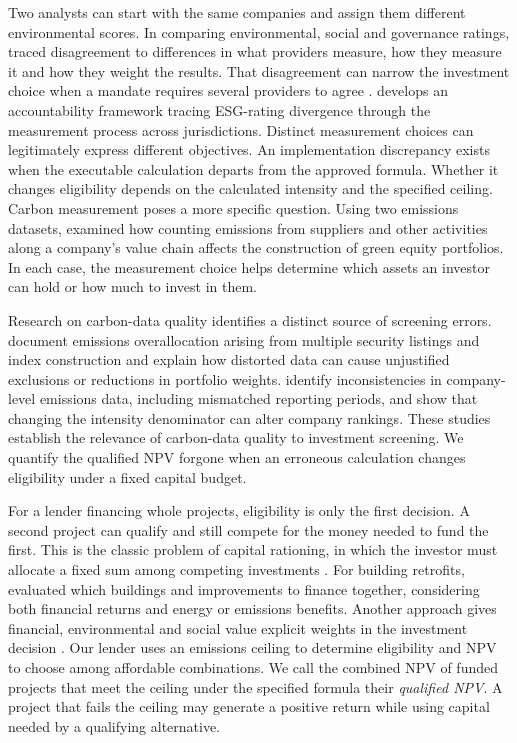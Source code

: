 Two analysts can start with the same companies and assign them different environmental scores. In comparing environmental, social and governance ratings, \citet{berg} traced disagreement to differences in what providers measure, how they measure it and how they weight the results. That disagreement can narrow the investment choice when a mandate requires several providers to agree \citep{lohmann}. \citet{tian2026} develops an accountability framework tracing ESG-rating divergence through the measurement process across jurisdictions. Distinct measurement choices can legitimately express different objectives. An implementation discrepancy exists when the executable calculation departs from the approved formula. Whether it changes eligibility depends on the calculated intensity and the specified ceiling. Carbon measurement poses a more specific question. Using two emissions datasets, \citet{anquetin} examined how counting emissions from suppliers and other activities along a company's value chain affects the construction of green equity portfolios. In each case, the measurement choice helps determine which assets an investor can hold or how much to invest in them.

Research on carbon-data quality identifies a distinct source of screening errors. \citet{gurvich2021} document emissions overallocation arising from multiple security listings and index construction and explain how distorted data can cause unjustified exclusions or reductions in portfolio weights. \citet{bajic2023} identify inconsistencies in company-level emissions data, including mismatched reporting periods, and show that changing the intensity denominator can alter company rankings. These studies establish the relevance of carbon-data quality to investment screening. We quantify the qualified NPV forgone when an erroneous calculation changes eligibility under a fixed capital budget.

For a lender financing whole projects, eligibility is only the first decision. A second project can qualify and still compete for the money needed to fund the first. This is the classic problem of capital rationing, in which the investor must allocate a fixed sum among competing investments \citep{lorie}. For building retrofits, \citet{he} evaluated which buildings and improvements to finance together, considering both financial returns and energy or emissions benefits. Another approach gives financial, environmental and social value explicit weights in the investment decision \citep{schoenmaker}. Our lender uses an emissions ceiling to determine eligibility and NPV to choose among affordable combinations. We call the combined NPV of funded projects that meet the ceiling under the specified formula their \emph{qualified NPV}. A project that fails the ceiling may generate a positive return while using capital needed by a qualifying alternative.

